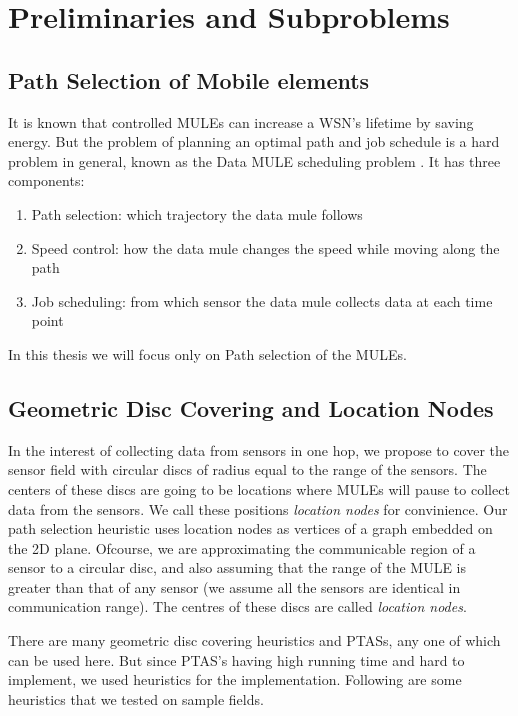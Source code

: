 \chapter{Preliminaries and Subproblems}

\section{Path Selection of Mobile elements}

It is known that controlled MULEs can increase a WSN's lifetime by saving energy. But the problem of planning an optimal path and job schedule is a hard problem in general, known as the Data MULE scheduling problem \cite{dms}. It has three components:
\begin{enumerate}
\item Path selection: which trajectory the data mule follows
\item Speed control: how the data mule changes the speed while moving along the path
\item Job scheduling: from which sensor the data mule collects data at each time point
\end{enumerate}
In this thesis we will focus only on Path selection of the MULEs.

\section{Geometric Disc Covering and Location Nodes}

In the interest of collecting data from sensors in one hop, we propose to cover the sensor field with circular discs of radius equal to the range of the sensors. The centers of these discs are going to be locations where MULEs will pause to collect data from the sensors. We call these positions \emph{location nodes} for convinience. Our path selection heuristic uses location nodes as vertices of a graph embedded on the 2D plane. Ofcourse, we are approximating the communicable region of a sensor to a circular disc, and also assuming that the range of the MULE is greater than that of any sensor (we assume all the sensors are identical in communication range). The centres of these discs are called \emph{location nodes}.

There are many \cite{} \cite{} geometric disc covering heuristics and PTASs, any one of which can be used here. But since PTAS's having high running time \cite{} and hard to implement, we used heuristics for the implementation. Following are some heuristics that we tested on sample fields.

